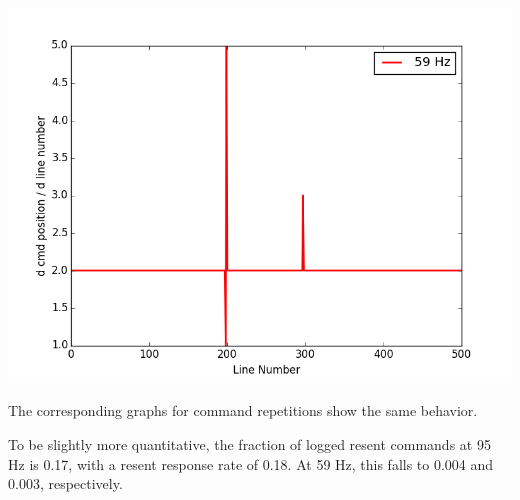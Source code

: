 \documentclass[12pt]{article}
\begin{document}
\includegraphics[scale=.7]{cmd_lno_59.png}

The corresponding graphs for command repetitions show the same behavior.

To be slightly more quantitative, the fraction of logged resent commands at 95 Hz is 0.17, with a resent response rate of 0.18. At 59 Hz, this falls to 0.004 and 0.003, respectively.
\end{document}

